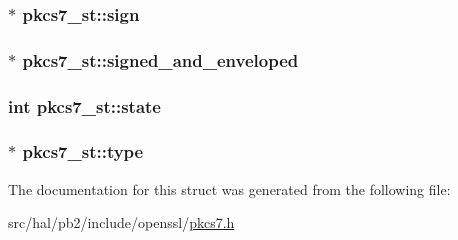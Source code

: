 \subsubsection[{\texorpdfstring{sign}{sign}}]{$\ast$ pkcs7\+\_\+st\+::sign}\hypertarget{structpkcs7__st_ad1a69f7c378d0594981d1f57be1a28c3}{}\label{structpkcs7__st_ad1a69f7c378d0594981d1f57be1a28c3}
\subsubsection[{\texorpdfstring{signed\+\_\+and\+\_\+enveloped}{signed_and_enveloped}}]{$\ast$ pkcs7\+\_\+st\+::signed\+\_\+and\+\_\+enveloped}\hypertarget{structpkcs7__st_afe69a67d002aad9fc12be3a3bc019551}{}\label{structpkcs7__st_afe69a67d002aad9fc12be3a3bc019551}
\subsubsection[{\texorpdfstring{state}{state}}]{\setlength{\rightskip}{0pt plus 5cm}int pkcs7\+\_\+st\+::state}\hypertarget{structpkcs7__st_a347c4591ec3bcf75f4dd86b430b20426}{}\label{structpkcs7__st_a347c4591ec3bcf75f4dd86b430b20426}
\subsubsection[{\texorpdfstring{type}{type}}]{$\ast$ pkcs7\+\_\+st\+::type}\hypertarget{structpkcs7__st_acd92bf461725525e7785077578ccf226}{}\label{structpkcs7__st_acd92bf461725525e7785077578ccf226}


The documentation for this struct was generated from the following file\+:\begin{DoxyCompactItemize}
\item 
src/hal/pb2/include/openssl/\hyperlink{pkcs7_8h}{pkcs7.\+h}\end{DoxyCompactItemize}
